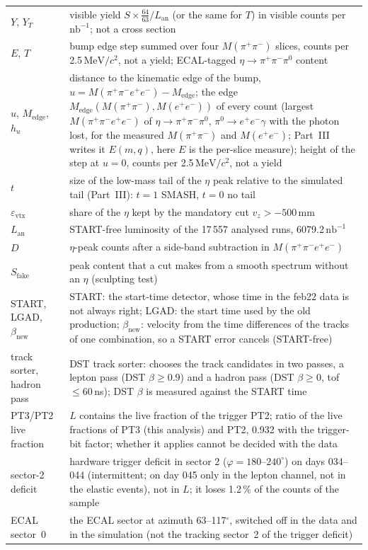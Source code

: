 \documentclass[11pt,a4paper]{article}
\newcommand{\piz}{\ensuremath{\pi^{0}}\xspace}
\newcommand{\ee}{\ensuremath{e^{+}e^{-}}\xspace}
\newcommand{\pipi}{\ensuremath{\pi^{+}\pi^{-}}\xspace}
\newcommand{\Mfour}{\ensuremath{M(\pi^{+}\pi^{-}e^{+}e^{-})}\xspace}
\newcommand{\Mee}{\ensuremath{M(e^{+}e^{-})}\xspace}
\newcommand{\Mpipi}{\ensuremath{M(\pi^{+}\pi^{-})}\xspace}
\newcommand{\betanew}{\ensuremath{\beta_{\mathrm{new}}}\xspace}
\newcommand{\nbinv}{\ensuremath{\mathrm{nb}^{-1}}\xspace}
\newcommand{\MeVcc}{\ensuremath{\mathrm{MeV}/c^{2}}\xspace}
\newcommand{\Lan}{\ensuremath{L_{\mathrm{an}}}\xspace}
\newcommand{\vz}{\ensuremath{v_z}\xspace}
\newcommand{\Medge}{\ensuremath{M_{\mathrm{edge}}}}%
\begin{document}
{\begin{longtable}{@{}>{\raggedright\arraybackslash}p{3.3cm} >{\raggedright\arraybackslash}p{\dimexpr\textwidth-3.3cm-2\tabcolsep\relax}@{}}
$Y$, $Y_T$ & visible yield $S\times\frac{64}{63}/\Lan$ (or the same for $T$) in visible counts per \nbinv; not a cross section \\
$E$, $T$ & bump edge step summed over four \Mpipi slices, counts per 2.5\,\MeVcc, not a yield; ECAL-tagged $\eta\to\pipi\piz$ content \\
$u$, \Medge, $h_u$ & distance to the kinematic edge of the bump, $u=\Mfour-\Medge$; the edge $\Medge(\Mpipi,\Mee)$ of every count (largest \Mfour of $\eta\to\pipi\piz$, $\piz\to\ee\gamma$ with the photon lost, for the measured \Mpipi and \Mee; Part~III writes it $E(m,q)$, here $E$ is the per-slice measure); height of the step at $u=0$, counts per 2.5\,\MeVcc, not a yield \\
$t$ & size of the low-mass tail of the $\eta$ peak relative to the simulated tail (Part~III): $t=1$ SMASH, $t=0$ no tail \\
$\varepsilon_{\mathrm{vtx}}$ & share of the $\eta$ kept by the mandatory cut $\vz>-500$\,mm \\
\Lan & START-free luminosity of the 17\,557 analysed runs, 6079.2\,\nbinv \\
$D$ & $\eta$-peak counts after a side-band subtraction in \Mfour \\
$S_{\mathrm{fake}}$ & peak content that a cut makes from a smooth spectrum without an $\eta$ (sculpting test) \\
START, LGAD, \betanew & START: the start-time detector, whose time in the feb22 data is not always right; LGAD: the start time used by the old production; \betanew: velocity from the time differences of the tracks of one combination, so a START error cancels (START-free) \\
track sorter, hadron pass & DST track sorter: chooses the track candidates in two passes, a lepton pass (DST $\beta\ge0.9$) and a hadron pass (DST $\beta\ge0$, tof $\le60$\,ns); DST $\beta$ is measured against the START time \\
PT3/PT2 live fraction & $L$ contains the live fraction of the trigger PT2; ratio of the live fractions of PT3 (this analysis) and PT2, 0.932 with the trigger-bit factor; whether it applies cannot be decided with the data \\
sector-2 deficit & hardware trigger deficit in sector 2 ($\varphi=180$--$240^\circ$) on days 034--044 (intermittent; on day 045 only in the lepton channel, not in the elastic events), not in $L$; it loses 1.2\,\% of the counts of the sample \\
ECAL sector~0 & the ECAL sector at azimuth 63--117$^\circ$, switched off in the data and in the simulation (not the tracking sector~2 of the trigger deficit) \\

\end{longtable}}
\end{document}

